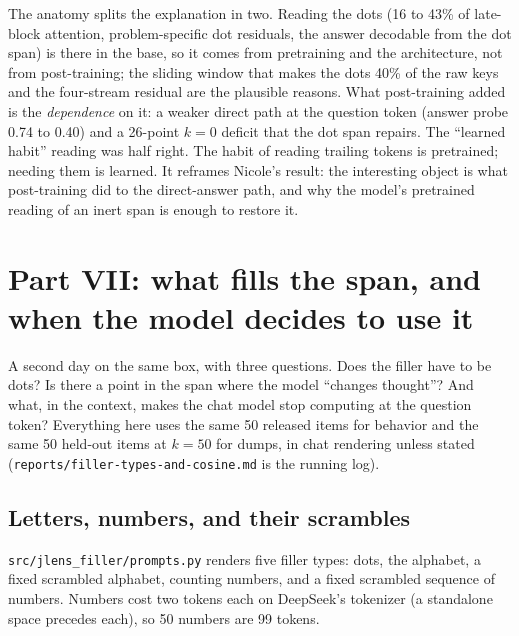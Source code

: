 \documentclass[11pt]{article}
\newcommand{\ttt}[1]{\texttt{\small #1}}
\begin{document}
The anatomy splits the explanation in two. Reading the dots (16 to 43\% of late-block attention, problem-specific dot residuals, the answer decodable from the dot span) is there in the base, so it comes from pretraining and the architecture, not from post-training; the sliding window that makes the dots 40\% of the raw keys and the four-stream residual are the plausible reasons. What post-training added is the \emph{dependence} on it: a weaker direct path at the question token (answer probe 0.74 to 0.40) and a 26-point $k=0$ deficit that the dot span repairs. The ``learned habit'' reading was half right. The habit of reading trailing tokens is pretrained; needing them is learned. It reframes Nicole's result: the interesting object is what post-training did to the direct-answer path, and why the model's pretrained reading of an inert span is enough to restore it.


\section{Part VII: what fills the span, and when the model decides to use it}

A second day on the same box, with three questions. Does the filler have to be dots? Is there a point in the span where the model ``changes thought''? And what, in the context, makes the chat model stop computing at the question token? Everything here uses the same 50 released items for behavior and the same 50 held-out items at $k=50$ for dumps, in chat rendering unless stated (\ttt{reports/filler-types-and-cosine.md} is the running log).

\subsection{Letters, numbers, and their scrambles}

\ttt{src/jlens\_filler/prompts.py} renders five filler types: dots, the alphabet, a fixed scrambled alphabet, counting numbers, and a fixed scrambled sequence of numbers. Numbers cost two tokens each on DeepSeek's tokenizer (a standalone space precedes each), so 50 numbers are 99 tokens.
\end{document}
